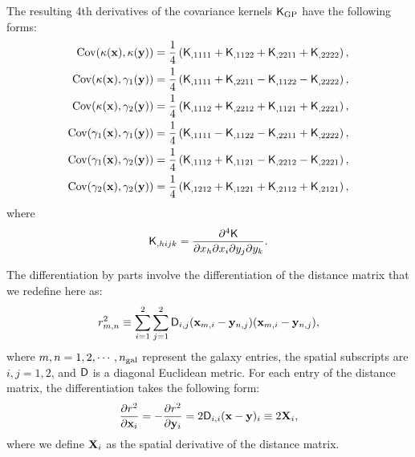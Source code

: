 The resulting 4th derivatives of the covariance
kernels $\mathsf{K}_{\rm GP}$ have the following forms: 
\begin{align}
	\mathrm{Cov} (\kappa(\mathbf{x}), \kappa(\mathbf{y}))
&= \frac{1}{4}\left(
\mathsf{K}_{,1111} + \mathsf{K}_{,1122} + \mathsf{K}_{,2211} + \mathsf{K}_{,2222}
\right), \label{eq:kernel_derivatives1}\\
\mathrm{Cov}(\kappa(\mathbf{x}), \gamma_1(\mathbf{y})) &= \frac{1}{4}\left(
\mathsf{K}_{,1111} + \mathsf{K}_{,2211} - \mathsf{K}_{,1122} - \mathsf{K}_{,2222}
\right), \\
\mathrm{Cov}(\kappa(\mathbf{x}), \gamma_2(\mathbf{y})) &= \frac{1}{4}\left(
\mathsf{K}_{,1112} + \mathsf{K}_{,2212} + \mathsf{K}_{,1121} + \mathsf{K}_{,2221}
\right),\\
\mathrm{Cov}(\gamma_1(\mathbf{x}), \gamma_1(\mathbf{y})) &= \frac{1}{4}\left(
\mathsf{K}_{,1111} - \mathsf{K}_{,1122} - \mathsf{K}_{,2211} + \mathsf{K}_{,2222}
\right), \\
\mathrm{Cov}(\gamma_1(\mathbf{x}), \gamma_2(\mathbf{y})) &= \frac{1}{4}\left(
\mathsf{K}_{,1112} + \mathsf{K}_{,1121} - \mathsf{K}_{,2212} - \mathsf{K}_{,2221}
\right), \\
\mathrm{Cov}(\gamma_2(\mathbf{x}), \gamma_2(\mathbf{y})) &= \frac{1}{4}\left(
\mathsf{K}_{,1212} + \mathsf{K}_{,1221} + \mathsf{K}_{,2112} + \mathsf{K}_{,2121}
\right), \label{eq:kernel_derivatives2}
\end{align}
where
\begin{equation}
	\mathsf{K}_{,hijk} = \frac{\partial^4 \mathsf{K}}{\partial x_h \partial x_i
	\partial y_j \partial y_k}.
\end{equation}

The differentiation by parts involve the differentiation of the distance matrix 
that we redefine here as:
\begin{equation}
	r_{m, n}^2 \equiv \sum_{i=1}^2 \sum_{j=1}^2 \mathsf{D}_{i, j}(\mathbf{x}_{m, i} - \mathbf{y}_{n, j}) (\mathbf{x}_{m, i} - \mathbf{y}_{n, j}), 
	\label{eq:distance}
\end{equation}
where $m, n = 1, 2, \cdots, n_{\rm gal}$ represent the galaxy entries, the spatial
subscripts are $i, j = 1,
2$, and $\mathsf{D}$ is a diagonal Euclidean metric.
For each entry of the distance matrix, the differentiation takes the following
form:
\begin{equation}
	\frac{\partial r^2}{\partial \mathbf{x}_i} = -\frac{\partial
	r^2}{\partial \mathbf{y}_i} =
	2 \mathsf{D}_{i, i}(\mathbf{x} - \mathbf{y})_i \equiv 2{\bf X}_i,
\end{equation}
where we define ${\bf X}_i$ as the spatial derivative of the distance matrix.

